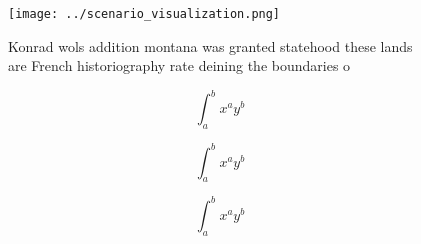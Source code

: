 \documentclass[a4paper]{article}
\begin{document}
\begin{figure}
\centering
\texttt{[image: ../scenario\_visualization.png]}
\caption{Konrad wols addition montana was granted statehood these lands are French historiography rate deining the boundaries o 
}
\end{figure}
 
\[ \int_{a}^{b}{x^{a}y^{b}} \]

\[ \int_{a}^{b}{x^{a}y^{b}} \]

\[ \int_{a}^{b}{x^{a}y^{b}} \]
\end{document}
